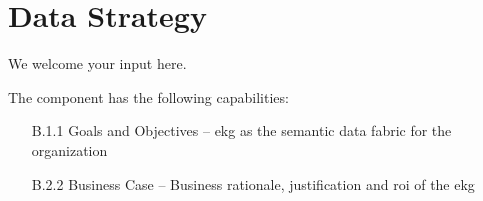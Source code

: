 \chapter{Data Strategy}\label{ch:ekgmm-b-1} %

We welcome your input here.

The  component has the following capabilities:

\begin{itemize}[leftmargin=.5in]
    \item[B.1.1] Goals and Objectives -- \gls{ekg} as the semantic data fabric for the organization
    \item[B.2.2] Business Case -- Business rationale, justification and \gls{roi} of the \gls{ekg}
\end{itemize}


